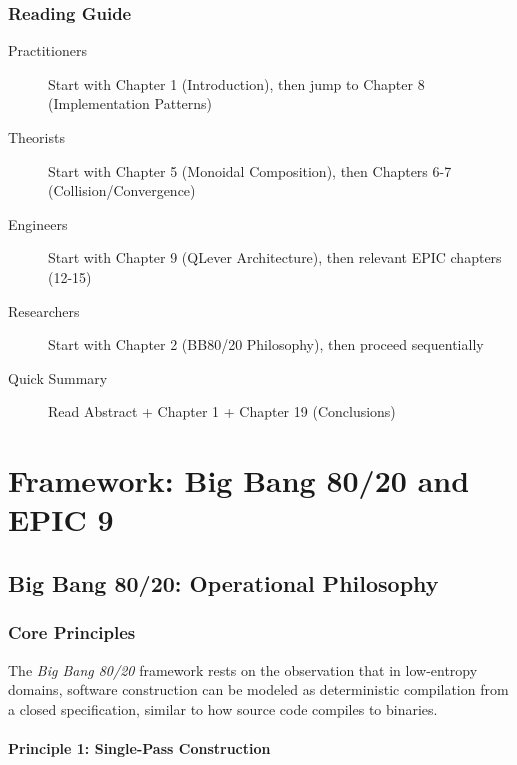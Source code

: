 \documentclass[12pt,oneside,a4paper]{book}
\newcommand{\BB}{\textit{Big Bang 80/20}\xspace}
\theoremstyle{definition}
\begin{document}
\section{Reading Guide}
\label{sec:intro-reading-guide}

\begin{description}
  \item[Practitioners] Start with Chapter 1 (Introduction), then jump to Chapter 8 (Implementation Patterns)
  \item[Theorists] Start with Chapter 5 (Monoidal Composition), then Chapters 6-7 (Collision/Convergence)
  \item[Engineers] Start with Chapter 9 (QLever Architecture), then relevant EPIC chapters (12-15)
  \item[Researchers] Start with Chapter 2 (BB80/20 Philosophy), then proceed sequentially
  \item[Quick Summary] Read Abstract + Chapter 1 + Chapter 19 (Conclusions)
\end{description}


\part{Framework: Big Bang 80/20 and EPIC 9}
\label{part:framework}

\chapter{Big Bang 80/20: Operational Philosophy}
\label{ch:bb80-philosophy}

\section{Core Principles}
\label{sec:bb80-core}

The \BB framework rests on the observation that in low-entropy domains,
software construction can be modeled as deterministic compilation from
a closed specification, similar to how source code compiles to binaries.

\subsection{Principle 1: Single-Pass Construction}
\end{document}
